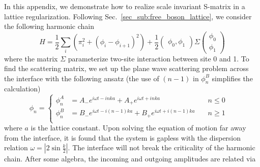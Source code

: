In this appendix, we demonstrate how to realize scale invariant S-matrix in a lattice regularization. Following Sec.~\ref{sec_sub:free_boson_lattice}, we consider the following harmonic chain 
\begin{equation}
H = \frac{1}{2} \sum_i \left(\pi_i^2  + ( \phi_i - \phi_{i+1} )^2 \right) +  \frac{1}{2} \begin{pmatrix}  \phi_0, \phi_1 \end{pmatrix}
\Sigma
\begin{pmatrix}
\phi_0 \\
\phi_1 
\end{pmatrix}
\end{equation}
where the matrix $\Sigma$ parameterize two-site interaction between site 0 and 1. To find the scattering matrix, we set up the plane wave scattering problem across the interface with the following ansatz (the use of $(n-1)$ in $\phi_n^B$ simplifies the calculation)
\begin{equation}
\label{eq:ansatz}
\phi_n
= \left\lbrace
  \begin{aligned}
    \phi_n^A &= A_{-} e^{i \omega t  - inka}  + A_{+} e^{i \omega t  + inka}  & \quad  n \le 0 \\
    \phi_n^B &= B_{-} e^{i \omega t  - i(n-1)ka}  + B_{+} e^{i \omega t  + i(n-1)ka} & \quad n \ge 1 \\
  \end{aligned} \right. 
 \quad 
\end{equation}
where $a$ is the lattice constant. Upon solving the equation of motion far away from the interface, it is found that the system is gapless with the dispersion relation $\omega = \left|2\sin\frac{k}{2}\right|$. The interface will not break the criticality of the harmonic chain\cite{peschel_exact_2012}. After some algebra, the incoming and outgoing amplitudes are related via
